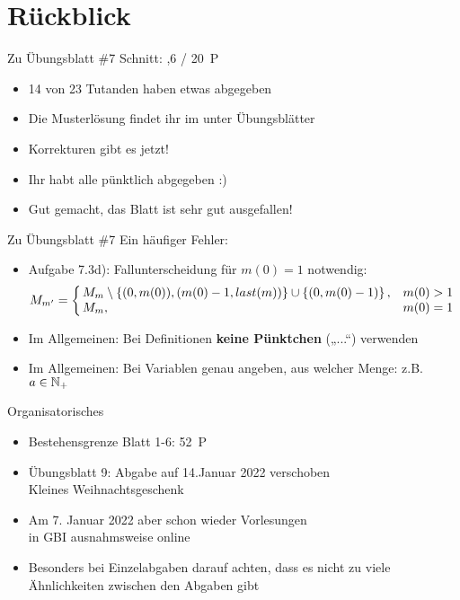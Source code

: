 
\newcommand{\handout}{}



\morescalingdelimiters



\section{Rückblick}

\begin{frame}{Zu Übungsblatt \#7}
	Schnitt: ,6 / 20~P

	\begin{itemize}[<+->]
		\item 14 von 23 Tutanden haben etwas abgegeben
		\item Die Musterlösung findet ihr im \ILIAS unter Übungsblätter
		\item Korrekturen gibt es jetzt!
		\item Ihr habt alle pünktlich abgegeben :)
		\item Gut gemacht, das Blatt ist sehr gut ausgefallen!
	\end{itemize}
\end{frame}

\begin{frame}{Zu Übungsblatt \#7}
	Ein häufiger Fehler:
	\begin{itemize}[<+->]
		\item Aufgabe 7.3d): Fallunterscheidung für $m(0) = 1$ notwendig: 
		$$ M_{m'} = 
		\casesl{M_m \setminus \set{(0, m(0)), (m(0)-1, last(m))} \cup \set{(0,m(0)-1)}, & m(0) > 1 \\
				M_m, & m(0) = 1}$$
		\item Im Allgemeinen: Bei Definitionen \textbf{keine Pünktchen} („...“) verwenden 
		\item Im Allgemeinen: Bei Variablen genau angeben, aus welcher Menge: z.B. $a\in \mathbb{N}_+$
	\end{itemize}
\end{frame}

\begin{frame}{Organisatorisches}
	\begin{itemize}[<+->]
		\item Bestehensgrenze Blatt 1-6: 52~P
		\item Übungsblatt 9: Abgabe auf 14.Januar 2022 verschoben\\
			\quad \impl Kleines Weihnachtsgeschenk
		\item Am 7. Januar 2022 aber schon wieder Vorlesungen\\
			\quad \impl in GBI ausnahmsweise online
		\item Besonders bei Einzelabgaben darauf achten, dass es nicht zu viele Ähnlichkeiten zwischen den Abgaben gibt
	\end{itemize}
\end{frame}

